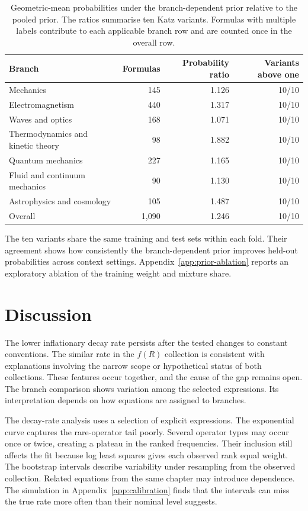 \documentclass[10pt]{article}
\begin{document}
\begin{table}[H]\centering\small
\begin{tabular}{lrrr}
\toprule
Branch & Formulas & Probability ratio & Variants above one \\
\midrule
Mechanics & 145 & 1.126 & 10/10 \\
Electromagnetism & 440 & 1.317 & 10/10 \\
Waves and optics & 168 & 1.071 & 10/10 \\
Thermodynamics and kinetic theory & 98 & 1.882 & 10/10 \\
Quantum mechanics & 227 & 1.165 & 10/10 \\
Fluid and continuum mechanics & 90 & 1.130 & 10/10 \\
Astrophysics and cosmology & 105 & 1.487 & 10/10 \\
\midrule
Overall & 1,090 & 1.246 & 10/10 \\
\bottomrule
\end{tabular}
\caption{Geometric-mean probabilities under the branch-dependent prior relative to the pooled prior. The ratios summarise ten Katz variants. Formulas with multiple labels contribute to each applicable branch row and are counted once in the overall row.}
\label{tab:prior-ratios}
\end{table}

The ten variants share the same training and test sets within each fold. Their agreement shows how consistently the branch-dependent prior improves held-out probabilities across context settings. Appendix~\ref{app:prior-ablation} reports an exploratory ablation of the training weight and mixture share.

\section{Discussion}\label{sec:discussion}
The lower inflationary decay rate persists after the tested changes to constant conventions. The similar rate in the $f(R)$ collection is consistent with explanations involving the narrow scope or hypothetical status of both collections. These features occur together, and the cause of the gap remains open. The branch comparison shows variation among the selected expressions. Its interpretation depends on how equations are assigned to branches.

The decay-rate analysis uses a selection of explicit expressions. The exponential curve captures the rare-operator tail poorly. Several operator types may occur once or twice, creating a plateau in the ranked frequencies. Their inclusion still affects the fit because log least squares gives each observed rank equal weight. The bootstrap intervals describe variability under resampling from the observed collection. Related equations from the same chapter may introduce dependence. The simulation in Appendix~\ref{app:calibration} finds that the intervals can miss the true rate more often than their nominal level suggests.
\end{document}
